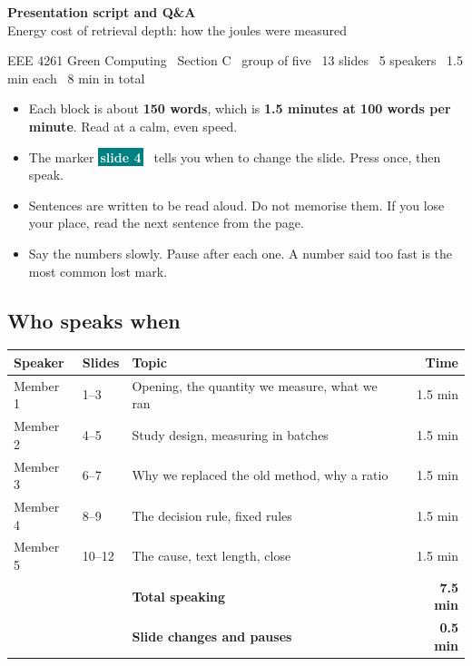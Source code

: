 \documentclass[11pt,a4paper]{article}
\newcommand{\slideref}[1]{%
  \colorbox{teal}{\textcolor{white}{\footnotesize\bfseries\,#1\,}}\ }
\begin{document}
\begin{titleband}
{\LARGE\bfseries\color{white} Presentation script and Q\&A}\\[5pt]
{\large\color{white} Energy cost of retrieval depth: how the joules were measured}
\end{titleband}

\vspace{4pt}
{\small\color{muted}EEE 4261 Green Computing \textperiodcentered\
Section C \textperiodcentered\ group of five \textperiodcentered\
13 slides \textperiodcentered\ 5 speakers \textperiodcentered\ 1.5 min each \textperiodcentered\
8 min in total\par}

\vspace{6pt}
\begin{notebox}
\begin{itemize}[leftmargin=1.2em,itemsep=2pt,topsep=0pt]
  \item Each block is about \textbf{150 words}, which is \textbf{1.5 minutes at 100 words per minute}. Read at a calm, even speed.
  \item The marker \slideref{slide 4} tells you when to change the slide. Press once, then speak.
  \item Sentences are written to be read aloud. Do not memorise them. If you lose your place, read the next sentence from the page.
  \item Say the numbers slowly. Pause after each one. A number said too fast is the most common lost mark.
\end{itemize}
\end{notebox}

\subsection*{Who speaks when}

\begin{center}
\small
\renewcommand{\arraystretch}{1.18}
\begin{tabularx}{\linewidth}{@{}llXr@{}}
\toprule
\rowcolor{forest!16} \textbf{Speaker} & \textbf{Slides} & \textbf{Topic} & \textbf{Time} \\
\midrule
Member 1 & 1--3 & Opening, the quantity we measure, what we ran & 1.5 min \\
Member 2 & 4--5 & Study design, measuring in batches & 1.5 min \\
Member 3 & 6--7 & Why we replaced the old method, why a ratio & 1.5 min \\
Member 4 & 8--9 & The decision rule, fixed rules & 1.5 min \\
Member 5 & 10--12 & The cause, text length, close & 1.5 min \\
\midrule
 & & \textbf{Total speaking} & \textbf{7.5 min} \\
 & & \textbf{Slide changes and pauses} & \textbf{0.5 min} \\
\bottomrule
\end{tabularx}
\end{center}
\end{document}
